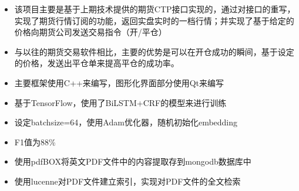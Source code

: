 \begin{itemize}
\setlength{\baselineskip}{18pt}
\justifying
\item 该项目主要是基于上期技术提供的期货CTP接口实现的，通过对接口的重写，实现了期货行情订阅的功能，返回实盘实时的一档行情；并实现了基于给定的价格向期货公司发送交易指令（开/平仓）
\item 与以往的期货交易软件相比，主要的优势是可以在开仓成功的瞬间，基于设定的价格，发送出平仓单来提高平仓的成功率。
\item 主要框架使用C++来编写，图形化界面部分使用Qt来编写
\end{itemize}
\smallskip

\divider

\begin{itemize}
\setlength{\baselineskip}{18pt}
\justifying
\item 基于TensorFlow，使用了BiLSTM+CRF的模型来进行训练
\item 设定batchsize=64，使用Adam优化器，随机初始化embedding
\item F1值为88\%
\end{itemize}
\smallskip

\divider

\begin{itemize}
\setlength{\baselineskip}{18pt}
\justifying
\item 使用pdfBOX将英文PDF文件中的内容提取存到mongodb数据库中
\item 使用lucenne对PDF文件建立索引，实现对PDF文件的全文检索
\end{itemize}
\smallskip


\par
\smallskip


\par
\smallskip

